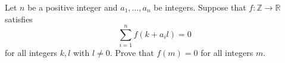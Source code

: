 Let $n$ be a positive integer and $a_1,\ldots,a_n$ be integers. Suppose that $f:\mathbb{Z}\to\mathbb{R}$ satisfies \[\displaystyle\sum_{i=1}^nf\left(k+a_il\right)=0\] for all integers $k,l$ with $l\neq0$. Prove that $f\left(m\right)=0$ for all integers $m$.
